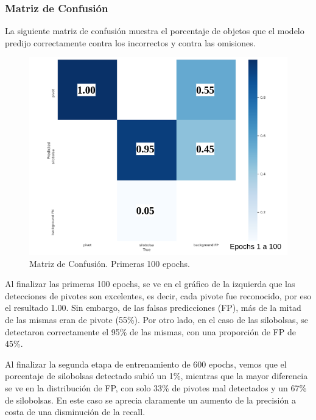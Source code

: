 \newpage
\subsubsection{Matriz de Confusión}
La siguiente matriz de confusión muestra el porcentaje de objetos que el modelo predijo correctamente contra los incorrectos y contra las omisiones.

\begin{figure}
    \centering
    \includegraphics[width=1\textwidth]{img/matriz_confusion_100.png}
    \caption{Matriz de Confusión. Primeras 100 epochs.}
    \label{fig:matriz-confusion-100}
\end{figure}
Al finalizar las primeras 100 epochs, se ve en el gráfico de la izquierda que las detecciones de pivotes son excelentes, es decir, cada pivote fue reconocido, por eso el resultado 1.00. Sin embargo, de las falsas predicciones (FP), más de la mitad de las mismas eran de pivote (55\%). Por otro lado, en el caso de las silobolsas, se detectaron correctamente el 95\% de las mismas, con una proporción de FP de 45\%.

\newpage
Al finalizar la segunda etapa de entrenamiento de 600 epochs, vemos que el porcentaje de silobolsas detectado subió un 1\%, mientras que la mayor diferencia se ve en la distribución de FP, con solo 33\% de pivotes mal detectados y un 67\% de silobolsas. En este caso se aprecia claramente un aumento de la precisión a costa de una disminución de la recall.

